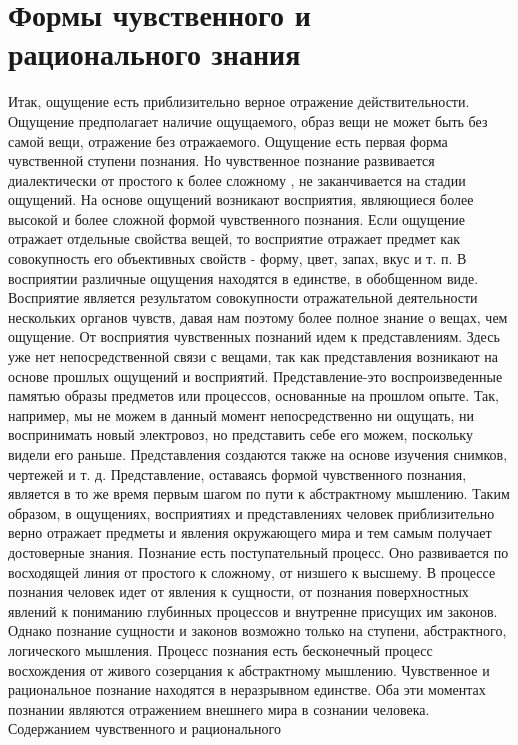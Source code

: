 \documentclass[12pt]{article}
\begin{document}
\newpage
\section{Формы чувственного и рационального знания}
Итак, ощущение есть приблизительно верное отражение действительности. Ощущение предполагает наличие
ощущаемого, образ вещи не может быть без самой вещи, отражение без отражаемого. Ощущение есть первая
форма чувственной ступени познания. Но чувственное познание развивается диалектически от простого к более
сложному , не заканчивается на стадии ощущений.
На  основе  ощущений  возникают  восприятия,  являющиеся  более  высокой  и  более  сложной  формой
чувственного познания. Если ощущение отражает отдельные свойства вещей, то восприятие отражает предмет
как совокупность его объективных свойств - форму, цвет, запах, вкус и т. п. В восприятии различные ощущения
находятся  в  единстве,  в  обобщенном  виде.  Восприятие  является  результатом  совокупности  отражательной
деятельности нескольких органов чувств, давая нам поэтому более полное знание о вещах, чем ощущение.
От восприятия чувственных познаний идем к представлениям. Здесь уже нет непосредственной связи с вещами,
так  как  представления  возникают  на  основе  прошлых  ощущений  и  восприятий.  Представление-это
воспроизведенные памятью образы предметов или процессов, основанные на прошлом опыте. Так, например,
мы  не  можем  в  данный  момент  непосредственно  ни  ощущать,  ни  воспринимать  новый  электровоз,  но
представить себе его можем, поскольку видели его раньше. Представления создаются также на основе изучения
снимков, чертежей и т. д. Представление, оставаясь формой чувственного познания, является в то же время
первым  шагом  по  пути  к  абстрактному  мышлению.  Таким  образом,  в  ощущениях,  восприятиях  и
представлениях человек приблизительно верно отражает предметы и явления окружающего мира и тем самым
получает достоверные знания.
Познание есть поступательный процесс. Оно развивается по восходящей линия от простого к сложному, от
низшего к высшему. В процессе познания человек идет от явления к сущности, от познания поверхностных
явлений к пониманию глубинных процессов и внутренне присущих им законов. Однако познание сущности и
законов возможно только на ступени, абстрактного, логического мышления.
Процесс познания есть бесконечный процесс восхождения от живого созерцания к абстрактному мышлению.
Чувственное  и  рациональное  познание  находятся  в  неразрывном  единстве.  Оба  эти  моментах  познании
являются  отражением  внешнего  мира  в  сознании  человека.  Содержанием  чувственного  и  рационального
\end{document}
